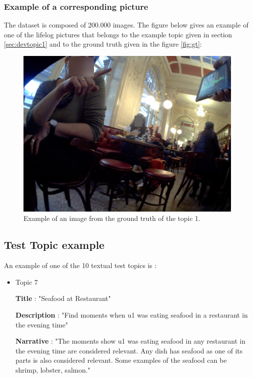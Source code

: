     \subsubsection{Example of a corresponding picture}

    The dataset is composed of 200.000 images. The figure below gives an example of one of the lifelog pictures that belongs to the example topic given in section \ref{sec:devtopic1} and to the ground truth given in the figure \ref{fig:gt}:

    \begin{figure}[htb]
        \centering
        \includegraphics[scale = 0.2]{Sections/5ImageClef/images/example.png}
        \caption{Example of an image from the ground truth of the topic 1.}
    \end{figure}
    

    \newpage


    \subsection{Test Topic example}

    An example of one of the 10 textual test topics is :

        \begin{itemize}

        \item Topic 7
        

        \textbf{Title} : "Seafood at Restaurant"

        \textbf{Description} : "Find moments when u1 was eating seafood in a restaurant in the evening time"

        \textbf{Narrative} : "The moments show u1 was eating seafood in any restaurant in the evening time are considered relevant. Any dish has seafood as one of its parts is also considered relevant. Some examples of the seafood can be shrimp, lobster, salmon."

        \end{itemize}


